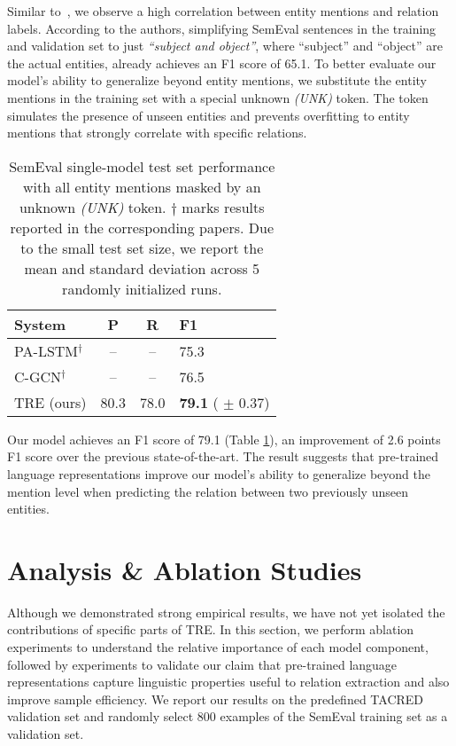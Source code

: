 \documentclass[akbc,twoside,11pt]{article}
\begin{document}
Similar to~\citet{zhang_graphco_2018}, we observe a high correlation between entity mentions and relation labels. According to the authors, simplifying SemEval sentences in the training and validation set to just \textit{``subject and object''}, where ``subject'' and ``object'' are the actual entities, already achieves an F1 score of 65.1. To better evaluate our model's ability to generalize beyond entity mentions, we substitute the entity mentions in the training set with a special unknown \textit{(UNK)} token. The token simulates the presence of unseen entities and prevents overfitting to entity mentions that strongly correlate with specific relations.
\begin{table}[ht!]
    \centering
    \begin{tabular}{l c c l}
        \hline
        System & P & R & F1 \\\hline
        PA-LSTM{$^\mathrm{\dagger}$} \citet{zhang_graphco_2018} & -- & -- & 75.3 \\
        C-GCN{$^\mathrm{\dagger}$} \citet{zhang_graphco_2018} & -- & -- & 76.5 \\
        TRE (ours) & 80.3 & 78.0 & \textbf{79.1} ( $\pm$ 0.37) \\\hline
    \end{tabular}
    \caption{SemEval single-model test set performance with all entity mentions masked by an unknown \textit{(UNK)} token. $\mathrm{\dagger}$ marks results reported in the corresponding papers. Due to the small test set size, we report the mean and standard deviation across 5 randomly initialized runs.}
    \label{tab:results_semeval_masked}
\end{table}
Our model achieves an F1 score of 79.1 (Table \ref{tab:results_semeval_masked}), an improvement of 2.6 points F1 score over the previous state-of-the-art. The result suggests that pre-trained language representations improve our model's ability to generalize beyond the mention level when predicting the relation between two previously unseen entities.

\section{Analysis \& Ablation Studies}
\label{analysis_discussion}
Although we demonstrated strong empirical results, we have not yet isolated the contributions of specific parts of TRE. In this section, we perform ablation experiments to understand the relative importance of each model component, followed by experiments to validate our claim that pre-trained language representations capture linguistic properties useful to relation extraction and also improve sample efficiency. We report our results on the predefined TACRED validation set and randomly select 800 examples of the SemEval training set as a validation set.
\end{document}
